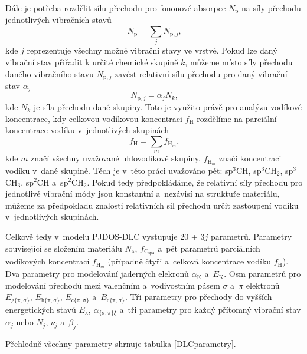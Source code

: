 Dále je potřeba rozdělit sílu přechodu pro fononové absorpce $N_\mathrm{p}$ na síly přechodu jednotlivých vibračních stavů
\begin{equation}
N_\mathrm{p} = \sum_j N_{\mathrm{p},j} \text{,}
\end{equation}
kde $j$ reprezentuje všechny možné vibrační stavy ve vrstvě. Pokud lze daný vibrační stav přiřadit k určité chemické skupině $k$, můžeme místo síly přechodu daného vibračního stavu $N_{\mathrm{p},j}$ zavést relativní sílu přechodu pro daný vibrační stav $\alpha_j$
\begin{equation}
N_{\mathrm{p},j} = 	\alpha_j N_k \text{,}
\label{reltransstr}
\end{equation}
kde $N_k$ je síla přechodu dané skupiny. Toto je využito právě pro analýzu vodíkové koncentrace, kdy celkovou vodíkovou koncentraci $f_\mathrm{H}$ rozdělíme na parciální koncentrace vodíku v~jednotlivých skupinách
\begin{equation}
f_\mathrm{H} =  \sum_m f_{\mathrm{H}_m} \text{,}
\end{equation}
kde $m$ značí všechny uvažované uhlovodíkové skupiny, $f_{\mathrm{H}_m}$ značí koncentraci vodíku v~dané skupině. Těch je v~této práci uvažováno pět: sp$^3$CH, sp$^3$CH$_2$, sp$^3$CH$_3$, sp$^2$CH a~sp$^2$CH$_2$. Pokud tedy předpokládáme, že relativní síly přechodu pro jednotlivé vibrační módy jsou konstantní a~nezávisí na struktuře materiálu, můžeme za předpokladu znalosti relativních sil přechodu určit zastoupení vodíku v~jednotlivých skupinách. 

Celkově tedy v~modelu PJDOS-DLC vystupuje 20 + 3$j$ parametrů. Parametry související se složením materiálu $N_\mathrm{a}$, $f_\mathrm{C_{sp3}}$ a~pět parametrů parciálních vodíkových koncentrací $f_{\mathrm{H}_m}$ (případně čtyři a~celková koncentrace vodíku $f_\mathrm{H}$). Dva parametry pro modelování jaderných elekronů $\alpha_\mathrm{K}$ a~$E_\mathrm{K}$. 
Osm parametrů pro modelování přechodů mezi valenčním a~vodivostním pásem $\sigma$ a~$\pi$ elektronů $E_\mathrm{g\{\pi,\sigma\}}$, $E_\mathrm{h\{\pi,\sigma\}}$, $E_\mathrm{c\{\pi,\sigma\}}$ a~$B_\mathrm{c\{\pi,\sigma\}}$. Tři parametry pro přechody do vyšších energetických stavů $E_\mathrm{x}$, $\alpha_{\{\sigma,\pi\}\xi}$ a~tři parametry pro každý přítomný vibrační stav $\alpha_j$ nebo $N_j$, $\nu_j$ a~$\beta_j$.

Přehledně všechny parametry shrnuje tabulka \ref{DLCparametry}.

